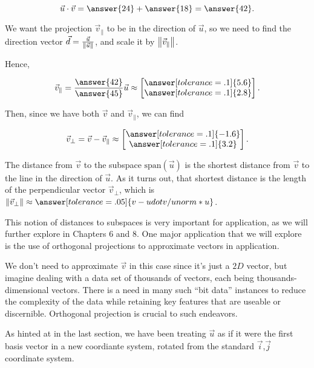 \documentclass{ximera}
\begin{document}
\begin{exploration}
\begin{example}
      $$\vec{u}\cdot\vec{v}=\answer{24}+\answer{18}=\answer{42}.$$

      We want the projection $\vec{v}_\parallel$ to be in the direction of $\vec{u}$, so we need to find the direction vector $\vec{d}=\frac{\vec{u}}{\left\|\vec{u}\right\|}$, and scale it by $\left\|\vec{v}_\parallel\right\|$.

      Hence, 

      $$\vec{v}_\parallel=\frac{\answer{42}}{\answer{45}}\vec{u}\approx\begin{bmatrix}
         \answer[tolerance=.1]{5.6}\\\answer[tolerance=.1]{2.8}
      \end{bmatrix}.$$

      Then, since we have both $\vec{v}$ and $\vec{v}_\parallel$, we can find 
      
      $$\vec{v}_\perp=\vec{v}-\vec{v}_\parallel\approx \begin{bmatrix}
         \answer[tolerance=.1]{-1.6}\\\answer[tolerance=.1]{3.2}
      \end{bmatrix}.$$

      The distance from $\vec{v}$ to the subspace $\mbox{span}(\vec{u})$ is the shortest distance from $\vec{v}$ to the line in the direction of $\vec{u}$. As it turns out, that shortest distance is the length of the perpendicular vector $\vec{v}_\perp$, which is $\norm{\vec{v}_\perp}\approx\answer[tolerance=.05]{v-udotv/unorm*u}$.
      
      \end{example}

   This notion of distances to subspaces is very important for application, as we will further explore in Chapters 6 and 8. One major application that we will explore is the use of orthogonal projections to approximate vectors in application. 

   We don't need to approximate $\vec{v}$ in this case since it's just a $2D$ vector, but imagine dealing with a data set of thousands of vectors, each being thousands-dimensional vectors. There is a need in many such ``bit data'' instances to reduce the complexity of the data while retaining key features that are useable or discernible. Orthogonal projection is crucial to such endeavors.


\end{exploration}

As hinted at in the last section, we have been treating $\vec{u}$ as if it were the first basis vector in a new coordiante system, rotated from the standard $\vec{i}$,$\vec{j}$ coordinate system.
\end{document}
